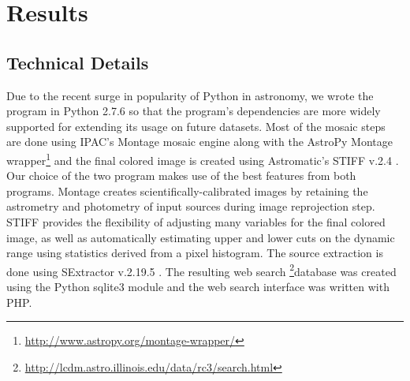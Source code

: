 \documentclass[5p]{elsarticle}
\begin{document}
\section{Results}
		\subsection{Technical Details}
		Due to the recent surge in popularity of Python in astronomy, we wrote the program in Python 2.7.6 so that the program's dependencies are more widely supported for extending its usage on future datasets. Most of the mosaic steps are done using IPAC's Montage  \cite{montage} mosaic engine along with the AstroPy Montage wrapper\footnote{\url{http://www.astropy.org/montage-wrapper/}} and the final colored image is created using Astromatic's STIFF v.2.4 \cite{stiff}. Our choice of the two program makes use of the best features from both programs. Montage creates scientifically-calibrated images by retaining the astrometry and photometry of input sources during image reprojection step. STIFF provides the flexibility of adjusting many variables for the final colored image, as well as automatically estimating upper and lower cuts on the dynamic range using statistics derived from a pixel histogram.  %
The source extraction is done using SExtractor v.2.19.5 \cite{sextractor}. The resulting web search \footnote{\url{http://lcdm.astro.illinois.edu/data/rc3/search.html}}database was created using the Python sqlite3 module and the web search interface was written with PHP.
\end{document}
